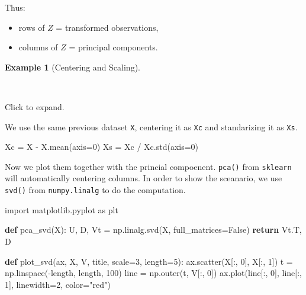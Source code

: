 \documentclass[
  letterpaper,
  DIV=11,
  numbers=noendperiod]{scrreprt}
\newenvironment{Shaded}{\begin{snugshade}}{\end{snugshade}}
\newcommand{\ControlFlowTok}[1]{\textcolor[rgb]{0.00,0.23,0.31}{\textbf{#1}}}
\newcommand{\DecValTok}[1]{\textcolor[rgb]{0.68,0.00,0.00}{#1}}
\newcommand{\ImportTok}[1]{\textcolor[rgb]{0.00,0.46,0.62}{#1}}
\newcommand{\KeywordTok}[1]{\textcolor[rgb]{0.00,0.23,0.31}{\textbf{#1}}}
\newcommand{\NormalTok}[1]{\textcolor[rgb]{0.00,0.23,0.31}{#1}}
\newcommand{\OperatorTok}[1]{\textcolor[rgb]{0.37,0.37,0.37}{#1}}
\newcommand{\StringTok}[1]{\textcolor[rgb]{0.13,0.47,0.30}{#1}}
\newcommand{\VariableTok}[1]{\textcolor[rgb]{0.07,0.07,0.07}{#1}}
\providecommand{\tightlist}{%
  \setlength{\itemsep}{0pt}\setlength{\parskip}{0pt}}
\theoremstyle{definition}
\theoremstyle{definition}
\newtheorem{example}{Example}[chapter]
\theoremstyle{plain}
\theoremstyle{plain}
\theoremstyle{remark}
\begin{document}
Thus:

\begin{itemize}
\tightlist
\item
  rows of \(Z\) = transformed observations,
\item
  columns of \(Z\) = principal components.
\end{itemize}

\begin{example}[Centering and
Scaling]\protect\hypertarget{exm-}{}\label{exm-}

~

Click to expand.

We use the same previous dataset \texttt{X}, centering it as \texttt{Xc}
and standarizing it as \texttt{Xs}.

\begin{Shaded}
\begin{Highlighting}[]
\NormalTok{Xc }\OperatorTok{=}\NormalTok{ X }\OperatorTok{{-}}\NormalTok{ X.mean(axis}\OperatorTok{=}\DecValTok{0}\NormalTok{)}
\NormalTok{Xs }\OperatorTok{=}\NormalTok{ Xc }\OperatorTok{/}\NormalTok{ Xc.std(axis}\OperatorTok{=}\DecValTok{0}\NormalTok{)}
\end{Highlighting}
\end{Shaded}

Now we plot them together with the princial compoenent. \texttt{pca()}
from \texttt{sklearn} will automatically centering columns. In order to
show the sceanario, we use \texttt{svd()} from \texttt{numpy.linalg} to
do the computation.

\begin{Shaded}
\begin{Highlighting}[]
\ImportTok{import}\NormalTok{ matplotlib.pyplot }\ImportTok{as}\NormalTok{ plt}


\KeywordTok{def}\NormalTok{ pca\_svd(X):}
\NormalTok{    U, D, Vt }\OperatorTok{=}\NormalTok{ np.linalg.svd(X, full\_matrices}\OperatorTok{=}\VariableTok{False}\NormalTok{)}
    \ControlFlowTok{return}\NormalTok{ Vt.T, D}


\KeywordTok{def}\NormalTok{ plot\_svd(ax, X, V, title, scale}\OperatorTok{=}\DecValTok{3}\NormalTok{, length}\OperatorTok{=}\DecValTok{5}\NormalTok{):}
\NormalTok{    ax.scatter(X[:, }\DecValTok{0}\NormalTok{], X[:, }\DecValTok{1}\NormalTok{])}
\NormalTok{    t }\OperatorTok{=}\NormalTok{ np.linspace(}\OperatorTok{{-}}\NormalTok{length, length, }\DecValTok{100}\NormalTok{)}
\NormalTok{    line }\OperatorTok{=}\NormalTok{ np.outer(t, V[:, }\DecValTok{0}\NormalTok{])}
\NormalTok{    ax.plot(line[:, }\DecValTok{0}\NormalTok{], line[:, }\DecValTok{1}\NormalTok{], linewidth}\OperatorTok{=}\DecValTok{2}\NormalTok{, color}\OperatorTok{=}\StringTok{"red"}\NormalTok{)}


\end{Highlighting}
\end{Shaded}
\end{example}
\end{document}
